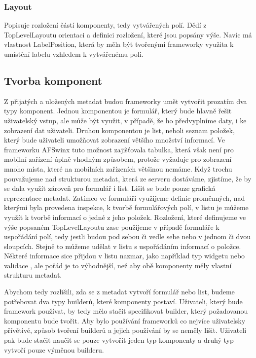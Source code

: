\subsubsection{Layout}
Popisuje rozložení částí komponenty, tedy vytvářených polí. Dědí z TopLevelLayoutu orientaci a definici rozložení, které jsou popsány výše. Navíc má vlastnost LabelPosition, která by měla být tvořenými frameworky využita k umístění labelu vzhledem k vytvářenému poli.

\subsection{Tvorba komponent}
Z přijatých a uložených metadat budou frameworky umět vytvořit prozatím dva typy komponent. Jednou komponentou je formulář, který bude hlavně řešit uživatelský vstup, ale může být využit, v případě, že ho předvyplníme daty, i ke zobrazení dat uživateli. Druhou komponentou je list, neboli seznam položek, který bude uživateli umožňovat zobrazení většího množství informací. Ve frameworku AFSwinx tuto možnost zajišťovala tabulka, která však není pro mobilní zařízení úplně vhodným způsobem, protože vyžaduje pro zobrazení mnoho místa, které na mobilních zařízeních většinou nemáme.
Když trochu pouvažujeme nad strukturou metadat, která ze serveru dostáváme, zjistíme, že by se dala využít zároveň pro formulář i list. Lišit se bude pouze grafická reprezentace metadat. Zatímco ve formuláři využijeme definic proměnných, nad kterými byla provedena inspekce, k tvorbě formulářových polí, v listu je můžeme využít k tvorbě informací o jedné z jeho položek. Rozložení, které definujeme ve výše popsaném TopLevelLayoutu zase použijeme v případě formuláře k uspořádání polí, tedy jestli budou pod sebou či vedle sebe nebo v jednom či dvou sloupcích. Stejně to můžeme udělat v listu s uspořádáním informací o položce. Některé informace sice přijdou v listu nazmar, jako například typ widgetu nebo validace , ale pořád je to výhodnější, než aby obě komponenty měly vlastní strukturu metadat. 

Abychom tedy rozlišili, zda se z metadat vytvoří formulář nebo list, budeme potřebovat dva typy builderů, které komponenty postaví. Uživateli, který bude framework používat, by tedy mělo stačit specifikovat builder, který požadovanou komponentu bude tvořit. Aby bylo používání frameworků co nejvíce uživatelsky přívětivé, způsob tvoření builderů a jejich používání by se neměly lišit. Uživateli pak bude stačit naučit se pouze vytvořit jeden typ komponenty a druhý typ vytvoří pouze výměnou builderu. 

